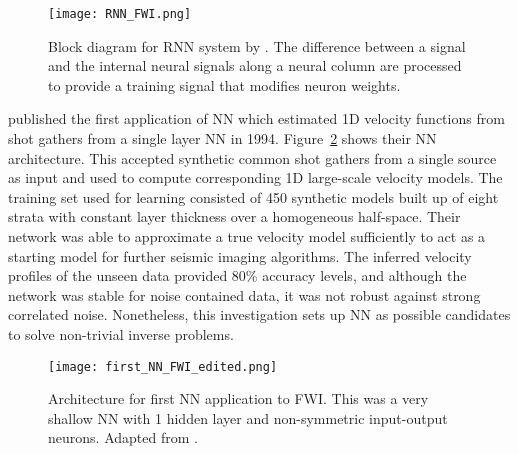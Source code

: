 \begin{figure}[ht!]
	\begin{minipage}[c]{0.55\textwidth}
		\centering
		\texttt{[image: RNN\_FWI.png]}
	\end{minipage}\hfill
	\begin{minipage}[c]{0.4\textwidth}
		\caption[Block diagram for RNN system by Michaels \& Smith (1992)]{Block diagram for RNN system by \citet{Michaels1992}. The difference between a signal and the internal neural signals along a neural column are processed to provide a training signal that modifies neuron weights.}
		\label{fig:Block_RNN_FWI}
	\end{minipage}
\end{figure}


\clearpage
\cite{Roth1994} published the first application of NN which estimated 1D velocity functions from shot gathers from a single layer NN in 1994. Figure~\ref{fig:first_NN_FWI} shows their NN architecture. This accepted synthetic common shot gathers from a single source as input and used to compute corresponding 1D large-scale velocity models. The training set used for learning consisted of 450 synthetic models built up of eight strata with constant layer thickness over a homogeneous half-space. Their network was able to approximate a true velocity model sufficiently to act as a starting model for further seismic imaging algorithms. The inferred velocity profiles of the unseen data provided 80\% accuracy levels, and although the network was stable for noise contained data, it was not robust against strong correlated noise. Nonetheless, this investigation sets up NN as possible candidates to solve non-trivial inverse problems.

\begin{figure}[ht!]
	\centering
	\texttt{[image: first\_NN\_FWI\_edited.png]}
	\caption[Architecture for first NN application to FWI.]{Architecture for first NN application to FWI. This was a very shallow NN with 1 hidden layer and non-symmetric input-output neurons. Adapted from \cite{Roth1994}.}
	\label{fig:first_NN_FWI}
\end{figure}

